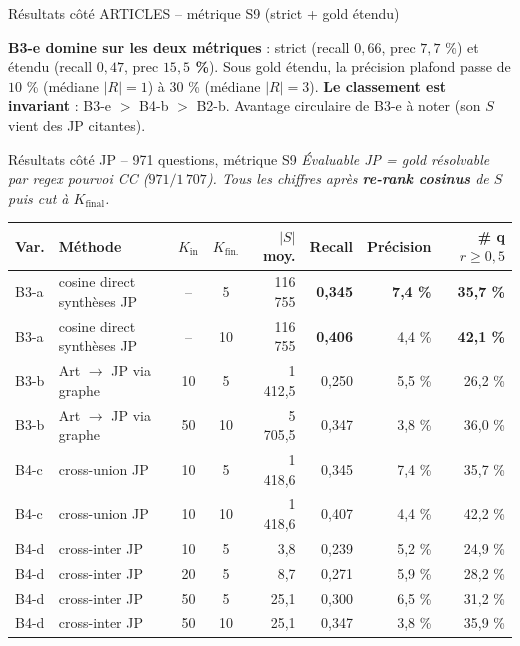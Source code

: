 \documentclass[aspectratio=169,10pt]{beamer}
\newcommand{\okbox}[1]{%
  \begin{center}
  \colorbox{green!10}{\parbox{0.92\linewidth}{\centering #1}}
  \end{center}}
\begin{document}
\begin{frame}{Résultats côté ARTICLES -- métrique S9 (strict + gold étendu)}
  \vspace{0.2em}
  \okbox{\textbf{B3-e domine sur les deux métriques} : strict (recall $0{,}66$, prec $7{,}7$ \%)
  et étendu (recall $0{,}47$, prec \textbf{$15{,}5$ \%}). Sous gold étendu, la précision plafond passe
  de $10$ \% (médiane $|R|=1$) à $30$ \% (médiane $|R|=3$). \textbf{Le classement est invariant} :
  B3-e $>$ B4-b $>$ B2-b. Avantage circulaire de B3-e à noter (son $S$ vient des JP citantes).}
\end{frame}

\begin{frame}{Résultats côté JP -- 971 questions, métrique S9}
  \tiny
  \textit{Évaluable JP = gold résolvable par regex pourvoi CC ($971/1\,707$).
  Tous les chiffres après \textbf{re-rank cosinus} de $S$ puis cut à $K_{\text{final}}$.}

  \vspace{0.3em}
  \scriptsize
  \renewcommand{\arraystretch}{1.1}
  \setlength{\tabcolsep}{3pt}
  \begin{center}
  \begin{tabular}{@{}l l c c r r r r@{}}
    \toprule
    \textbf{Var.} & \textbf{Méthode}
    & $K_{\text{in}}$ & $K_{\text{fin.}}$ & $|S|$ moy.
    & \textbf{Recall} & \textbf{Précision} & \textbf{\# q $r\geq 0{,}5$} \\
    \midrule
    \rowcolor{accentsoft}
    B3-a & cosine direct synthèses JP    & -- &  5 & 116 755 & \textbf{0,345} & \textbf{7,4 \%} & \textbf{35,7 \%} \\
    \rowcolor{accentsoft}
    B3-a & cosine direct synthèses JP    & -- & 10 & 116 755 & \textbf{0,406} & 4,4 \% & \textbf{42,1 \%} \\
    \midrule
    B3-b & Art $\to$ JP via graphe       & 10 &  5 & 1 412,5 & 0,250 & 5,5 \% & 26,2 \% \\
    B3-b & Art $\to$ JP via graphe       & 50 & 10 & 5 705,5 & 0,347 & 3,8 \% & 36,0 \% \\
    \midrule
    B4-c & cross-union JP                & 10 &  5 & 1 418,6 & \textcolor{warn}{0,345} & 7,4 \% & 35,7 \% \\
    B4-c & cross-union JP                & 10 & 10 & 1 418,6 & \textcolor{warn}{0,407} & 4,4 \% & 42,2 \% \\
    \midrule
    B4-d & cross-inter JP                & 10 &  5 & 3,8     & 0,239 & 5,2 \% & 24,9 \% \\
    B4-d & cross-inter JP                & 20 &  5 & 8,7     & 0,271 & 5,9 \% & 28,2 \% \\
    B4-d & cross-inter JP                & 50 &  5 & 25,1    & 0,300 & 6,5 \% & 31,2 \% \\
    B4-d & cross-inter JP                & 50 & 10 & 25,1    & 0,347 & 3,8 \% & 35,9 \% \\
    \bottomrule
  \end{tabular}
  \end{center}


\end{frame}
\end{document}
